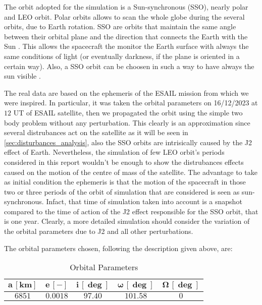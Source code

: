 The orbit adopted for the simulation is a Sun-synchronous (SSO), nearly polar and LEO orbit. Polar orbits allows to scan the whole globe during
the several orbits, due to Earth rotation. SSO are orbits that maintain the same angle between their orbital plane and the direction that connects
the Earth with the Sun \cite{curtis_book}. This allows the spacecraft the monitor the Earth surface with always the same conditions of light 
(or eventually darkness, if the plane is oriented in a certain way). Also, a SSO orbit can be choosen in such a way to have always the sun visible \cite{esa_sso_site}.

The real data are based on the ephemeris of the ESAIL mission from which we were inspired. In particular, it was taken the orbital parameters on 16/12/2023 at $12$ UT of ESAIL satellite, then we 
propagated the orbit using the simple two body problem  without any perturbation. This clearly is an approximation since several distrubances act 
on the satellite as it will be seen in \autoref{sec:disturbances_analysis}, also the SSO orbits are intrisically caused by the J2 effect of Earth.
Nevertheless, the simulation of few LEO orbit's periods considered in this report wouldn't be enough to show the distrubances effects caused on 
the motion of the centre of mass of the satellite. The advantage to take as initial condition the ephemeris is that the motion of the spacecraft in 
those two or three periods of the orbit of simulation that are considered is seen as sun-synchronous. Infact, that time of simulation taken into account
is a snapshot compared to the time of action of the J2 effect responsible for the SSO orbit, that is one year. Clearly, a more detailed simulation should
consider the variation of the orbital parameters due to J2 and all other perturbations.

The orbital parameters chosen, following the description given above, are:

\begin{table}[H]

    \centering
    \begin{tabular}{|c|c|c|c|c|}
    \hline
    $\bm{a \, [km]}$ & $\bm{e \, [-]}$ & $\bm{i \, [\deg]}$  & $\bm{\omega \, [\deg]}$   & $\bm{\Omega \, [\deg]}$ \\
    \hline
    $6851$ & $0.0018$ & $97.40$ & $101.58$ & $0$ \\
    \hline
    \end{tabular}
    
    \caption{Orbital Parameters}
    \label{table:orb_table}
    
\end{table}

